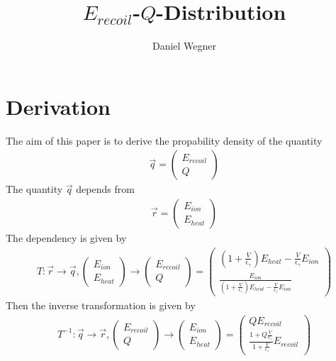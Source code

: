 \documentclass[10pt, a4paper]{article}
\title{$E_{recoil}$-$Q$-Distribution}
\author{Daniel Wegner}
\begin{document}
\maketitle
\tableofcontents
\newpage

\section{Derivation}
The aim of this paper is to derive the propability density of the quantity
\begin{gather}
\vec{q} = \begin{pmatrix} E_{recoil} \\ Q \end{pmatrix}
\end{gather}
The quantity $\vec{q}$ depends from 
\begin{gather}
\vec{r} = \begin{pmatrix} E_{ion} \\ E_{heat} \end{pmatrix}
\end{gather}
The dependency is given by
\begin{gather}
T: \vec{r} \rightarrow \vec{q} , \begin{pmatrix} E_{ion} \\ E_{heat} \end{pmatrix}  \rightarrow \begin{pmatrix} E_{recoil} \\ Q \end{pmatrix} = \begin{pmatrix} \left( 1 + \frac{V}{\epsilon_\gamma} \right) E_{heat} - \frac{V}{\epsilon_\gamma} E_{ion} \\ \frac{E_{ion}}{\left( 1 + \frac{V}{\epsilon_\gamma} \right) E_{heat} - \frac{V}{\epsilon_\gamma} E_{ion}} \end{pmatrix}
\end{gather}
Then the inverse transformation is given by
\begin{gather}
T^{-1}: \vec{q} \rightarrow \vec{r}, \begin{pmatrix} E_{recoil} \\ Q \end{pmatrix} \rightarrow \begin{pmatrix} E_{ion} \\ E_{heat} \end{pmatrix} = \begin{pmatrix} Q E_{recoil} \\ \frac{1 + Q \frac{V}{\epsilon_\gamma}}{1 + \frac{V}{\epsilon_\gamma}} E_{recoil} \end{pmatrix}
\end{gather}
\end{document}
